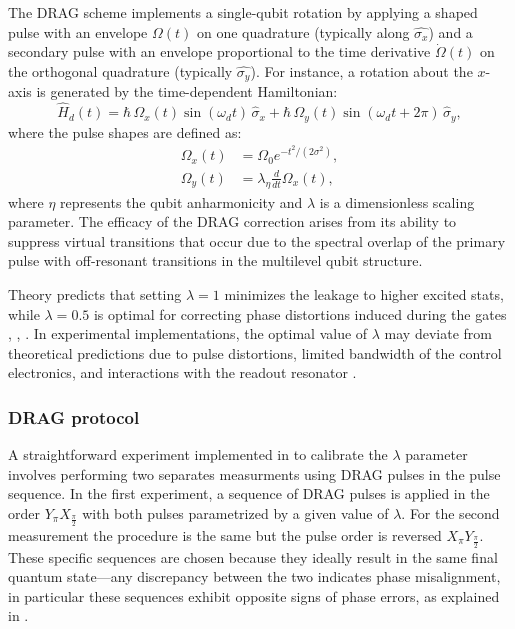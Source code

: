 The DRAG scheme implements a single-qubit rotation by applying a shaped pulse with an envelope $\Omega(t)$ on one quadrature (typically along $\hat{\sigma_x}$) and a secondary pulse with an envelope proportional to the time derivative $\dot{\Omega}(t)$ on the orthogonal quadrature (typically $\hat{\sigma_y}$).
For instance, a rotation about the $x$-axis is generated by the time-dependent Hamiltonian\cite{manenti_quantum_2023}:
\begin{equation}\label{eq:DRAG_hamiiltonian}
    \hat{H}_d(t) = \hbar \, \Omega_x(t) \sin(\omega_d t) \, \hat{\sigma}_x + \hbar \, \Omega_y(t) \sin(\omega_d t + 2\pi) \, \hat{\sigma}_y,
\end{equation}
where the pulse shapes are defined as:
\begin{align}
    \Omega_x(t) &= \Omega_0 e^{-t^2 / (2\sigma^2)}, \\
    \Omega_y(t) &= \lambda_\eta \frac{d}{dt} \Omega_x(t),
\end{align}
where $\eta$ represents the qubit anharmonicity and $\lambda$ is a dimensionless scaling parameter.
The efficacy of the DRAG correction arises from its ability to suppress virtual transitions that occur due to the spectral overlap of the primary pulse with off-resonant transitions in the multilevel qubit structure.

Theory predicts that setting $\lambda=1$ minimizes the leakage to higher excited stats, while $\lambda=0.5$ is optimal for correcting phase distortions induced during the gates \cite{Motzoi_2009}, \cite{Gambetta_2011}, \cite{Motzoi2013}.
In experimental implementations, the optimal value of $\lambda$ may deviate from theoretical predictions due to pulse distortions, limited bandwidth of the control electronics, and interactions with the readout resonator \cite{PhysRevA.82.040305}.

\subsubsection{DRAG protocol}
A straightforward experiment implemented in \Qibocal to calibrate the $\lambda$ parameter involves performing two separates measurments using DRAG pulses in the pulse sequence.
In the first experiment, a sequence of DRAG pulses is applied in the order $Y_{\pi}$$X_{\frac{\pi}{2}}$ with both pulses parametrized by a given value of $\lambda$. 
For the second measurement the procedure is the same but the pulse order is reversed $X_{\pi}$$Y_{\frac{\pi}{2}}$.
These specific sequences are chosen because they ideally result in the same final quantum state—any discrepancy between the two indicates phase misalignment, in particular these sequences exhibit opposite signs of phase errors, as explained in \cite{reed2013entanglementquantumerrorcorrection}. 

